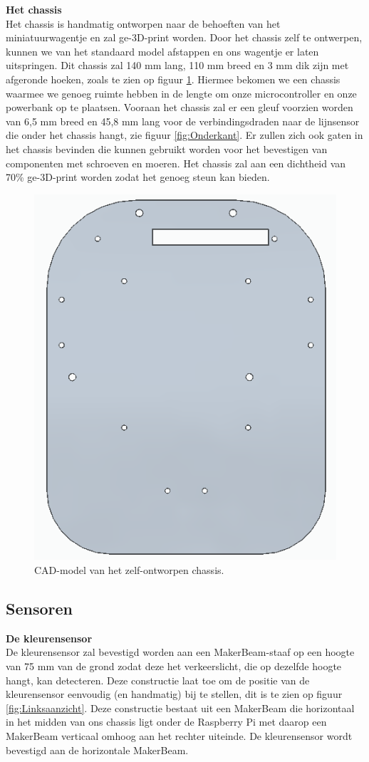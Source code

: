 \documentclass[a4paper,kulak]{kulakarticle}
\begin{document}
\noindent\textbf{\large Het chassis} \\
Het chassis is handmatig ontworpen naar de behoeften van het miniatuurwagentje en zal ge-3D-print worden. Door het chassis zelf te ontwerpen, kunnen we van het standaard model afstappen en ons wagentje er laten uitspringen. Dit chassis zal 140 mm lang, 110 mm breed en 3 mm dik zijn met afgeronde hoeken, zoals te zien op figuur \ref{fig:chassis}. Hiermee bekomen we een chassis waarmee we genoeg ruimte hebben in de lengte om onze microcontroller en onze powerbank op te plaatsen. Vooraan het chassis zal er een gleuf voorzien worden van 6,5 mm breed en 45,8 mm lang voor de verbindingsdraden naar de lijnsensor die onder het chassis hangt, zie figuur \ref{fig:Onderkant}. Er zullen zich ook gaten in het chassis bevinden die kunnen gebruikt worden voor het bevestigen van componenten met schroeven en moeren. Het chassis zal aan een dichtheid van 70\% ge-3D-print worden zodat het genoeg steun kan bieden.

\begin{figure}[h]
	\centering
	\includegraphics[width=.4\textwidth] {chascad}
	\caption{CAD-model van het zelf-ontworpen chassis.}
	\label{fig:chassis}
\end{figure}

\subsection{Sensoren}
\textbf{\large De kleurensensor} \\
De kleurensensor zal bevestigd worden aan een MakerBeam-staaf op een hoogte van 75 mm van de grond zodat deze het verkeerslicht, die op dezelfde hoogte hangt, kan detecteren. Deze constructie laat toe om de positie van de kleurensensor eenvoudig (en handmatig) bij te stellen, dit is te zien op figuur \ref{fig:Linksaanzicht}. Deze constructie bestaat uit een MakerBeam die horizontaal in het midden van ons chassis ligt onder de Raspberry Pi met daarop een MakerBeam verticaal omhoog aan het rechter uiteinde. De kleurensensor wordt bevestigd aan de horizontale MakerBeam. \\ \\
\\ \\
\
\end{document}
